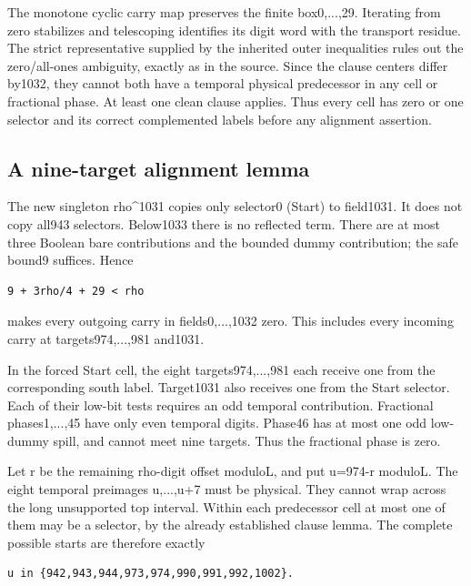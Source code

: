The monotone cyclic carry map preserves the finite box0,...,29. Iterating from zero stabilizes and telescoping identifies its digit word with the transport residue. The strict representative supplied by the inherited outer inequalities rules out the zero/all-ones ambiguity, exactly as in the source. Since the clause centers differ by1032, they cannot both have a temporal physical predecessor in any cell or fractional phase. At least one clean clause applies. Thus every cell has zero or one selector and its correct complemented labels before any alignment assertion.

\subsection{A nine-target alignment lemma}
The new singleton rho\textasciicircum{}1031 copies only selector0 (Start) to field1031. It does not copy all943 selectors. Below1033 there is no reflected term. There are at most three Boolean bare contributions and the bounded dummy contribution; the safe bound9 suffices. Hence

\begin{Verbatim}[fontsize=\small,breaklines=true,breakanywhere=true,breaksymbolleft={}]
9 + 3rho/4 + 29 < rho
\end{Verbatim}

makes every outgoing carry in fields0,...,1032 zero. This includes every incoming carry at targets974,...,981 and1031.

In the forced Start cell, the eight targets974,...,981 each receive one from the corresponding south label. Target1031 also receives one from the Start selector. Each of their low-bit tests requires an odd temporal contribution. Fractional phases1,...,45 have only even temporal digits. Phase46 has at most one odd low-dummy spill, and cannot meet nine targets. Thus the fractional phase is zero.

Let r be the remaining rho-digit offset moduloL, and put u=974-r moduloL. The eight temporal preimages u,...,u+7 must be physical. They cannot wrap across the long unsupported top interval. Within each predecessor cell at most one of them may be a selector, by the already established clause lemma. The complete possible starts are therefore exactly

\begin{Verbatim}[fontsize=\small,breaklines=true,breakanywhere=true,breaksymbolleft={}]
u in {942,943,944,973,974,990,991,992,1002}.
\end{Verbatim}

